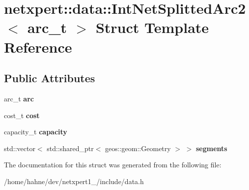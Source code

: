 \hypertarget{structnetxpert_1_1data_1_1IntNetSplittedArc2}{}\section{netxpert\+:\+:data\+:\+:Int\+Net\+Splitted\+Arc2$<$ arc\+\_\+t $>$ Struct Template Reference}
\label{structnetxpert_1_1data_1_1IntNetSplittedArc2}
\subsection*{Public Attributes}
\begin{DoxyCompactItemize}
\item 
arc\+\_\+t {\bfseries arc}\hypertarget{structnetxpert_1_1data_1_1IntNetSplittedArc2_a288ceb24231ed62ee4a947babd95ecc5}{}\label{structnetxpert_1_1data_1_1IntNetSplittedArc2_a288ceb24231ed62ee4a947babd95ecc5}

\item 
cost\+\_\+t {\bfseries cost}\hypertarget{structnetxpert_1_1data_1_1IntNetSplittedArc2_a37026da4ee83e794a32d5e9f6d898829}{}\label{structnetxpert_1_1data_1_1IntNetSplittedArc2_a37026da4ee83e794a32d5e9f6d898829}

\item 
capacity\+\_\+t {\bfseries capacity}\hypertarget{structnetxpert_1_1data_1_1IntNetSplittedArc2_a14333cffdec76e58f337ad929305482d}{}\label{structnetxpert_1_1data_1_1IntNetSplittedArc2_a14333cffdec76e58f337ad929305482d}

\item 
std\+::vector$<$ std\+::shared\+\_\+ptr$<$ geos\+::geom\+::\+Geometry $>$ $>$ {\bfseries segments}\hypertarget{structnetxpert_1_1data_1_1IntNetSplittedArc2_af02eef99a5c7b46aa89f2636bf6c134f}{}\label{structnetxpert_1_1data_1_1IntNetSplittedArc2_af02eef99a5c7b46aa89f2636bf6c134f}

\end{DoxyCompactItemize}


The documentation for this struct was generated from the following file\+:\begin{DoxyCompactItemize}
\item 
/home/hahne/dev/netxpert1\+\_/include/data.\+h\end{DoxyCompactItemize}
